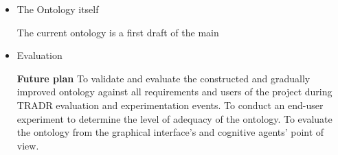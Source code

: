 \begin{itemize}
\begin{itemize}
\end{itemize}


\item The Ontology itself

The current ontology is a first draft of the main 

\item Evaluation



\textbf{Future plan}
To validate and evaluate the constructed and gradually improved ontology against all requirements and users of the project during TRADR evaluation and experimentation events. To conduct an end-user experiment to determine the level of adequacy of the ontology. To evaluate the ontology from the graphical interface's and cognitive agents' point of view.  

\end{itemize}
  
  
  
  